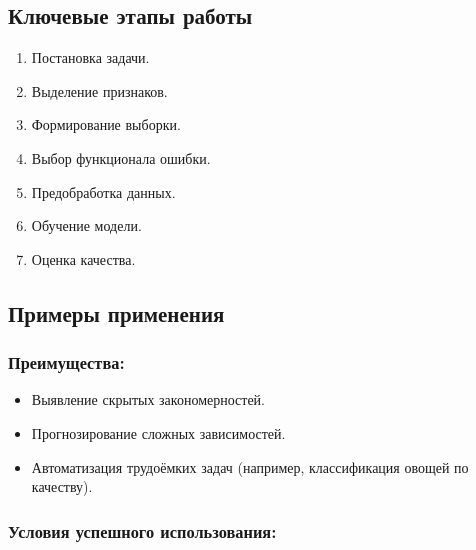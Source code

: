\hypertarget{ux43aux43bux44eux447ux435ux432ux44bux435-ux44dux442ux430ux43fux44b-ux440ux430ux431ux43eux442ux44b}{%
\subsection*{Ключевые этапы
работы}\label{ux43aux43bux44eux447ux435ux432ux44bux435-ux44dux442ux430ux43fux44b-ux440ux430ux431ux43eux442ux44b}}

\begin{enumerate}
\def\labelenumi{\arabic{enumi}.}
\tightlist
\item
  Постановка задачи.
\item
  Выделение признаков.
\item
  Формирование выборки.
\item
  Выбор функционала ошибки.
\item
  Предобработка данных.
\item
  Обучение модели.
\item
  Оценка качества.
\end{enumerate}

\hypertarget{ux43fux440ux438ux43cux435ux440ux44b-ux43fux440ux438ux43cux435ux43dux435ux43dux438ux44f}{%
\subsection*{Примеры
применения}\label{ux43fux440ux438ux43cux435ux440ux44b-ux43fux440ux438ux43cux435ux43dux435ux43dux438ux44f}}

\hypertarget{ux43fux440ux435ux438ux43cux443ux449ux435ux441ux442ux432ux430}{%
\subsubsection*{Преимущества:}\label{ux43fux440ux435ux438ux43cux443ux449ux435ux441ux442ux432ux430}}

\begin{itemize}
\tightlist
\item
  Выявление скрытых закономерностей.
\item
  Прогнозирование сложных зависимостей.
\item
  Автоматизация трудоёмких задач (например, классификация овощей по
  качеству).
\end{itemize}

\hypertarget{ux443ux441ux43bux43eux432ux438ux44f-ux443ux441ux43fux435ux448ux43dux43eux433ux43e-ux438ux441ux43fux43eux43bux44cux437ux43eux432ux430ux43dux438ux44f}{%
\subsubsection*{Условия успешного
использования:}\label{ux443ux441ux43bux43eux432ux438ux44f-ux443ux441ux43fux435ux448ux43dux43eux433ux43e-ux438ux441ux43fux43eux43bux44cux437ux43eux432ux430ux43dux438ux44f}}

